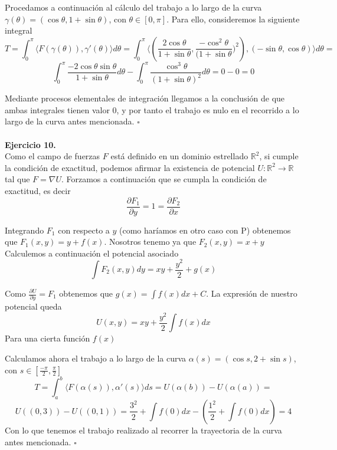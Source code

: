 \documentclass[fleqn]{article}
\newcommand*{\QED}{\hfill\ensuremath{\square}}
\def\R{\mathds{R}}
\begin{document}
    Procedamos a continuación al cálculo del trabajo a lo largo de la curva $\gamma (\theta)=(\cos\theta, 1+\sin\theta)$, con $\theta \in [0,\pi]$.
    Para ello, consideremos la siguiente integral
    $$T=\int_0^{\pi} \langle F\left(\gamma(\theta)\right), \gamma'(\theta)\rangle d\theta = 
    \int_0^{\pi} \langle \left(\frac{2\cos\theta}{1+\sin\theta}, \frac{-\cos^2\theta}{(1+\sin\theta})^2\right), (-\sin\theta, \cos\theta) \rangle d\theta = $$
    $$\int_0^{\pi} \frac{-2\cos\theta \sin\theta}{1+\sin\theta}d\theta - \int_0^{\pi} \frac{\cos^3\theta}{(1+\sin\theta)^2}d\theta = 0-0 = 0$$

    Mediante procesos elementales de integración llegamos a la conclusión de que ambas integrales tienen valor 0, y por tanto el trabajo es nulo
    en el recorrido a lo largo de la curva antes mencionada. \QED \\ \\

    {\bf{Ejercicio 10.}} \\

    Como el campo de fuerzas $F$ está definido en un dominio estrellado $\R^2$, si cumple la condición de exactitud, podemos afirmar la existencia
    de potencial $U:\R^2 \rightarrow \R$ tal que $F=\nabla U$. Forzamos a continuación que se cumpla la condición de exactitud, es decir
    $$\frac{\partial F_1}{\partial y} = 1 = \frac{\partial F_2}{\partial x}$$
    
    Integrando $F_1$ con respecto a $y$ (como haríamos en otro caso con P) obtenemos que $F_1(x,y)=y+ f(x)$. Nosotros tenemo ya que
    $F_2(x,y)=x+y$ Calculemos a continuación el potencial asociado
    $$\int F_2(x,y) dy = xy + \frac{y^2}{2} + g(x)$$
    
    Como $\frac{\partial U}{\partial y} = F_1$ obtenemos que $g(x)=\int f(x)dx + C$. La expresión de nuestro potencial queda
    $$U(x,y)= xy + \frac{y^2}{2} \int f(x)dx$$
    Para una cierta función $f(x)$

    Calculamos ahora el trabajo a lo largo de la curva $\alpha (s) = (\cos s, 2+ \sin s)$, con $s \in \left[\frac{-\pi}{2},\frac{\pi}{2}\right]$
    $$T=\int _a^b \langle F(\alpha(s)), \alpha'(s) \rangle ds = U(\alpha(b))-U(\alpha(a)) =
    $$$$U((0,3))-U((0,1)) = \frac{3^2}{2} + \int f(0)dx - \left(\frac{1^2}{2} + \int f(0)dx\right)=4$$
    Con lo que tenemos el trabajo realizado al recorrer la trayectoria de la curva antes mencionada. \QED
\end{document}
